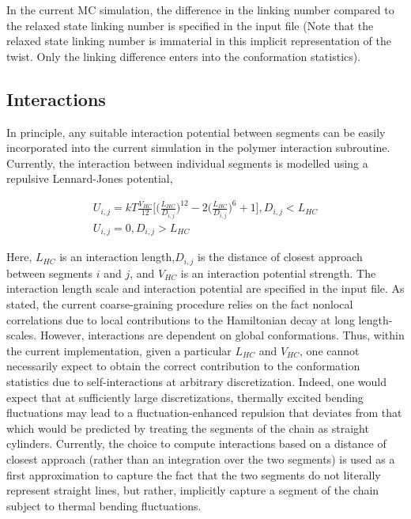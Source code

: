 \documentclass[english]{article}
\begin{document}
In the current MC simulation, the difference in the linking number compared to the relaxed state linking number is specified in the input file (Note that the relaxed state linking number is immaterial in this implicit representation of the twist. Only the linking difference enters into the conformation statistics).

\subsection{Interactions}

In principle, any suitable interaction potential between segments can be easily incorporated into the current simulation in the polymer interaction subroutine. Currently, the interaction between individual segments is  modelled using a repulsive Lennard-Jones potential, 

\begin{gather}
U_{i,j}=kT\frac{V_{HC}}{12}\Big[\Big(\frac{L_{HC}}{D_{i,j}}\Big)^{12}-2\Big(\frac{L_{HC}}{D_{i,j}}\Big)^6+1\Big], D_{i,j}<L_{HC} \\
U_{i,j}=0 ,D_{i,j}>L_{HC}
\label{LJRepulsion}
\end{gather}

Here, $L_{HC}$ is an interaction length,$D_{i,j}$ is the distance of closest approach between segments $i$ and $j$, and $V_{HC}$ is an interaction potential strength. The interaction length scale and interaction potential are specified in the input file. As stated, the current coarse-graining procedure relies on the fact nonlocal correlations due to local contributions to the Hamiltonian decay at long length-scales. However, interactions are dependent on global conformations. Thus, within the current implementation, given a particular $L_{HC}$ and $V_{HC}$, one cannot necessarily expect to obtain the correct contribution to the conformation statistics due to self-interactions at arbitrary discretization. Indeed, one would expect that at sufficiently large discretizations, thermally excited bending fluctuations may lead to a fluctuation-enhanced repulsion that deviates from that which would be predicted by treating the segments of the chain as straight cylinders. Currently, the choice to compute interactions based on a distance of closest approach (rather than an integration over the two segments) is used as a first approximation to capture the fact that the two segments do not literally represent straight lines, but rather, implicitly capture a segment of the chain subject to thermal bending fluctuations. 
\end{document}
